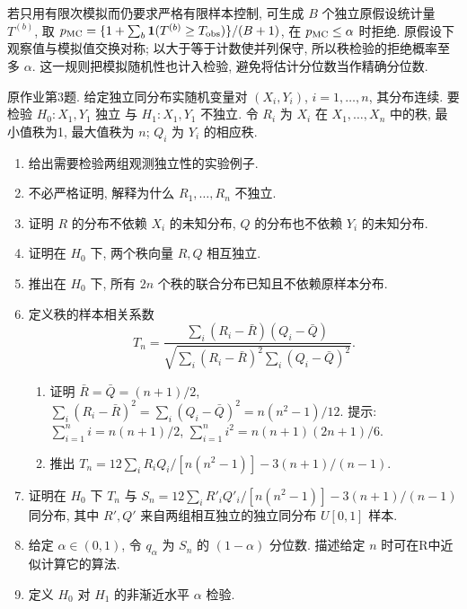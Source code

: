 \begin{solution}
\begin{enumerate}[label=\arabic*.]
\begin{enumerate}[label=\alph*)]
若只用有限次模拟而仍要求严格有限样本控制, 可生成 $B$ 个独立原假设统计量 $T^{(b)}$, 取
$p_{\rm MC}=\{1+\sum_b\mathbf 1(T^{(b)}\ge T_{\rm obs})\}/(B+1)$,
在 $p_{\rm MC}\le\alpha$ 时拒绝. 原假设下观察值与模拟值交换对称; 以大于等于计数使并列保守, 所以秩检验的拒绝概率至多 $\alpha$. 这一规则把模拟随机性也计入检验, 避免将估计分位数当作精确分位数.
\end{enumerate}
\end{enumerate}
\end{solution}

\begin{exercise}\label{ps07:p03}
原作业第3题. 给定独立同分布实随机变量对 $(X_i,Y_i)$, $i=1,\ldots,n$, 其分布连续. 要检验 $H_0:X_1,Y_1\text{ 独立}$ 与 $H_1:X_1,Y_1\text{ 不独立}$. 令 $R_i$ 为 $X_i$ 在 $X_1,\ldots,X_n$ 中的秩, 最小值秩为1, 最大值秩为 $n$; $Q_i$ 为 $Y_i$ 的相应秩.
\begin{enumerate}[label=\arabic*.]
\item 给出需要检验两组观测独立性的实验例子.
\item 不必严格证明, 解释为什么 $R_1,\ldots,R_n$ 不独立.
\item 证明 $R$ 的分布不依赖 $X_i$ 的未知分布, $Q$ 的分布也不依赖 $Y_i$ 的未知分布.
\item 证明在 $H_0$ 下, 两个秩向量 $R,Q$ 相互独立.
\item 推出在 $H_0$ 下, 所有 $2n$ 个秩的联合分布已知且不依赖原样本分布.
\item 定义秩的样本相关系数
\[
T_n=\frac{\sum_i(R_i-\bar R)(Q_i-\bar Q)}{\sqrt{\sum_i(R_i-\bar R)^2\sum_i(Q_i-\bar Q)^2}}.
\]
\begin{enumerate}[label=\alph*)]
\item 证明 $\bar R=\bar Q=(n+1)/2$, $\sum_i(R_i-\bar R)^2=\sum_i(Q_i-\bar Q)^2=n(n^2-1)/12$. 提示: $\sum_{i=1}^ni=n(n+1)/2$, $\sum_{i=1}^ni^2=n(n+1)(2n+1)/6$.
\item 推出 $T_n=12\sum_iR_iQ_i/[n(n^2-1)]-3(n+1)/(n-1)$.
\end{enumerate}
\item 证明在 $H_0$ 下 $T_n$ 与
$S_n=12\sum_iR'_iQ'_i/[n(n^2-1)]-3(n+1)/(n-1)$ 同分布, 其中 $R',Q'$ 来自两组相互独立的独立同分布 $U[0,1]$ 样本.
\item 给定 $\alpha\in(0,1)$, 令 $q_\alpha$ 为 $S_n$ 的 $(1-\alpha)$ 分位数. 描述给定 $n$ 时可在R中近似计算它的算法.
\item 定义 $H_0$ 对 $H_1$ 的非渐近水平 $\alpha$ 检验.
\end{enumerate}
\end{exercise}
